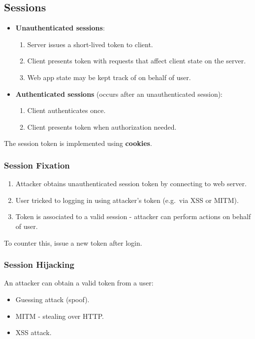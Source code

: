 \documentclass[11pt]{article}
\begin{document}
\subsection{Sessions}
\begin{itemize}
  \item \textbf{Unauthenticated sessions}:
    \begin{enumerate}
      \item Server issues a short-lived token to client.
      \item Client presents token with requests that affect client state on the server.
      \item Web app state may be kept track of on behalf of user.
    \end{enumerate}
  \item \textbf{Authenticated sessions} (occurs after an unauthenticated session):
    \begin{enumerate}
      \item Client authenticates once.
      \item Client presents token when authorization needed.
    \end{enumerate}
\end{itemize}

The session token is implemented using \textbf{cookies}.

\subsubsection{Session Fixation}
\begin{enumerate}
  \item Attacker obtains unauthenticated session token by connecting to web server.
  \item User tricked to logging in using attacker's token (e.g.\ via XSS or MITM).
  \item Token is associated to a valid session - attacker can perform actions on behalf of user.
\end{enumerate}
To counter this, issue a new token after login.

\subsubsection{Session Hijacking}
An attacker can obtain a valid token from a user:
\begin{itemize}
  \item Guessing attack (spoof).
  \item MITM - stealing over HTTP.
  \item XSS attack.
\end{itemize}
\end{document}
